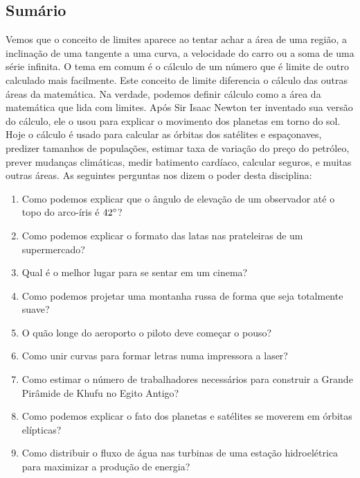 \subsection{Sumário}
Vemos que o conceito de limites aparece ao tentar achar a área de uma região, a inclinação de uma tangente a uma curva, a velocidade do carro ou a soma de uma série infinita. O tema em comum é o cálculo de um número que é limite de outro calculado mais facilmente. Este conceito de limite diferencia o cálculo das outras áreas da matemática. Na verdade, podemos definir cálculo como a área da matemática que lida com limites. Após Sir Isaac Newton ter inventado sua versão do cálculo, ele o usou para explicar o movimento dos planetas em torno do sol. Hoje o cálculo é usado para calcular as órbitas dos satélites e espaçonaves, predizer tamanhos de populações, estimar taxa de variação do preço do petróleo, prever mudanças climáticas, medir batimento cardíaco, calcular seguros, e muitas outras áreas. As seguintes perguntas nos dizem o poder desta disciplina:
\begin{enumerate}
  \item Como podemos explicar que o ângulo de elevação de um observador até o topo do arco-íris é $42\degree$?
  \item Como podemos explicar o formato das latas nas prateleiras de um supermercado?
  \item Qual é o melhor lugar para se sentar em um cinema?
  \item Como podemos projetar uma montanha russa de forma que seja totalmente suave?
  \item O quão longe do aeroporto o piloto deve começar o pouso?
  \item Como unir curvas para formar letras numa impressora a laser?
  \item Como estimar o número de trabalhadores necessários para construir a Grande Pirâmide de Khufu no Egito Antigo?
  \item Como podemos explicar o fato dos planetas e satélites se moverem em órbitas elípticas?
  \item Como distribuir o fluxo de água nas turbinas de uma estação hidroelétrica para maximizar a produção de energia?
\end{enumerate}

